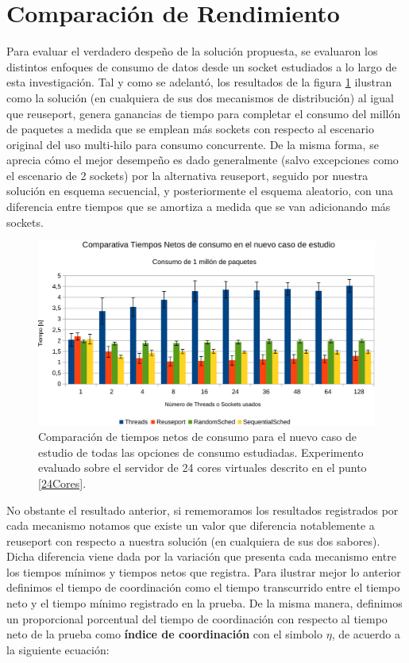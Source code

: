 \section{Comparación de Rendimiento}

Para evaluar el verdadero despeño de la solución propuesta, se evaluaron los distintos enfoques de consumo de datos desde un socket estudiados a lo largo de esta investigación. Tal y como se adelantó, los resultados de la figura \ref{fig:resultadoMiModulovsTodos} ilustran como la solución (en cualquiera de sus dos mecanismos de distribución) al igual que reuseport, genera ganancias de tiempo para completar el consumo del millón de paquetes a medida que se emplean más sockets con respecto al escenario original del uso multi-hilo para consumo concurrente. De la misma forma, se aprecia cómo el mejor desempeño es dado generalmente (salvo excepciones como el escenario de 2 sockets) por la alternativa reuseport, seguido por nuestra solución en esquema secuencial, y posteriormente el esquema aleatorio, con una diferencia entre tiempos que se amortiza a medida que se van adicionando más sockets.

\begin{figure}[!h]
	\centering
	\includegraphics[scale=.6]{resultados/modulovstodos1-crop.pdf}
	\caption{Comparación de tiempos netos de consumo para el nuevo caso de estudio de todas las opciones de consumo estudiadas. Experimento evaluado sobre el servidor de 24 cores virtuales descrito en el punto \ref{24Cores}.}
	\label{fig:resultadoMiModulovsTodos}
\end{figure}

No obstante el resultado anterior, si rememoramos los resultados registrados por cada mecanismo notamos que existe un valor que diferencia notablemente a reuseport con respecto a nuestra solución (en cualquiera de sus dos sabores). Dicha diferencia viene dada por la variación que presenta cada mecanismo entre los tiempos mínimos y tiempos netos que registra. Para ilustrar mejor lo anterior definimos el tiempo de coordinación como el tiempo transcurrido entre el tiempo neto y el tiempo mínimo registrado en la prueba. De la misma manera, definimos un proporcional porcentual del tiempo de coordinación con respecto al tiempo neto de la prueba como \textbf{índice de coordinación} con el simbolo $\eta$, de acuerdo a la siguiente ecuación:


